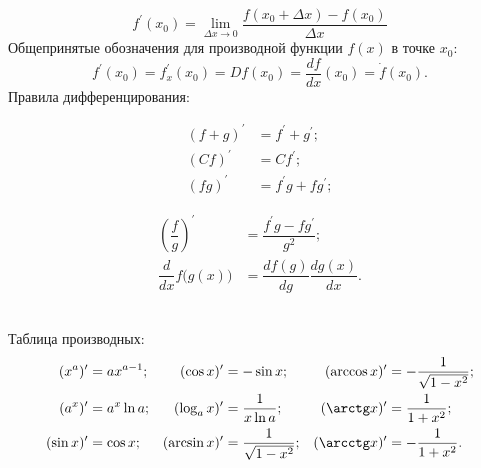 \begin{equation}
	f^\prime(x_0) = \lim_{\Delta x \to 0}\frac{f(x_0 + \Delta x) - f(x_0)}{\Delta x}
\end{equation}
Общепринятые обозначения для производной функции $f(x)$ в точке $x_0$:
\begin{equation}
	f^\prime(x_0) = f^\prime_x(x_0) = D f(x_0) = \frac{d f}{d x}(x_0) = \dot{f} (x_0).
\end{equation}
Правила дифференцирования:\\[-0.5pc]
\begin{minipage}{0.5\textwidth}
	\begin{align*}
		(f+g)^\prime &= f^\prime + g^\prime;\\
		(Cf)^\prime &= Cf^\prime;\\
		(fg)^\prime &= f^\prime g + f g^\prime;
	\end{align*}
\end{minipage}
\begin{minipage}{0.5\textwidth}
	\begin{align*}
		\left(\dfrac{f}{g}\right)^\prime &= \dfrac{f^\prime g - f g^\prime}{g^2};\\
		\dfrac{d}{dx}f\bigl(g(x)\bigr) &= \dfrac{df(g)}{dg}\dfrac{dg(x)}{dx}.
	\end{align*}
\end{minipage}\\[0.5pc]
Таблица производных:
\begin{align*}
	(x^a)^\prime &= a x^{a-1};
	& (\cos x)^\prime &= - \sin x;
	& (\arccos x)^\prime &= - \dfrac{1}{\sqrt{1 - x^2}};\\
	(a^x)^\prime &= a^x \ln a;
	& (\log_a x)^\prime &= \dfrac{1}{x \ln a};
	& (\arctg x)^\prime &= \dfrac{1}{1 + x^2};\\
	(\sin x)^\prime &= \cos x;
	& (\arcsin x)^\prime &=
	\dfrac{1}{\sqrt{1 - x^2}};
	&  (\arcctg x)^\prime &= - \dfrac{1}{1 + x^2}.
\end{align*}
